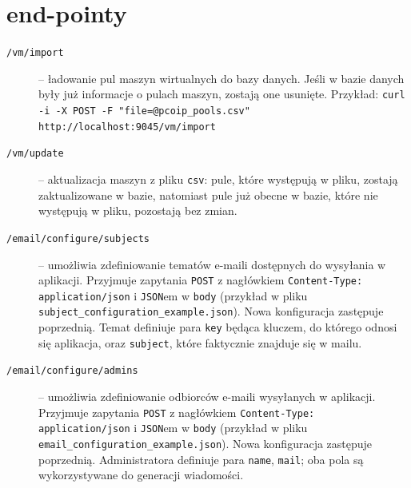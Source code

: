 \documentclass[a4paper]{article}
\begin{document}
  \section{end-pointy}
  \begin{description}
    \item[\texttt{/vm/import}] -- ładowanie pul maszyn wirtualnych do bazy danych. Jeśli w bazie danych były już informacje o pulach maszyn, zostają one usunięte. Przykład: \texttt{curl -i -X POST -F "file=@pcoip\_pools.csv" http://localhost:9045/vm/import}
    \item[\texttt{/vm/update}] -- aktualizacja maszyn z pliku \texttt{csv}: pule, które występują w pliku, zostają zaktualizowane w bazie, natomiast pule już obecne w bazie, które nie występują w pliku, pozostają bez zmian.
    \item[\texttt{/email/configure/subjects}] -- umożliwia zdefiniowanie tematów e-maili dostępnych do wysyłania w aplikacji. Przyjmuje zapytania \texttt{POST} z nagłówkiem \texttt{Content-Type: application/json} i \texttt{JSON}em w \texttt{body} (przykład w pliku \texttt{subject\_configuration\_example.json}). Nowa konfiguracja zastępuje poprzednią. Temat definiuje para \texttt{key} będąca kluczem, do którego odnosi się aplikacja, oraz \texttt{subject}, które faktycznie znajduje się w mailu.
    \item[\texttt{/email/configure/admins}] -- umożliwia zdefiniowanie odbiorców e-maili wysyłanych w aplikacji. Przyjmuje zapytania \texttt{POST} z nagłówkiem \texttt{Content-Type: application/json} i \texttt{JSON}em w \texttt{body} (przykład w pliku \texttt{email\_configuration\_example.json}). Nowa konfiguracja zastępuje poprzednią. Administratora definiuje para \texttt{name}, \texttt{mail}; oba pola są wykorzystywane do generacji wiadomości.
  \end{description}
\end{document}
